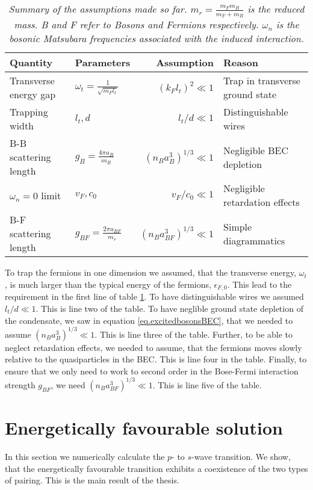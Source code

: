 \begin{table}[htb]
\def\arraystretch{1.3}
\centering
\caption{\textit{Summary of the assumptions made so far. $m_r = \frac{m_Fm_B}{m_F+m_B}$ is the reduced mass. B and F refer to Bosons and Fermions respectively. $\omega_n$ is the bosonic Matsubara frequencies associated with the induced interaction.}}
\begin{tabular}{|l|l|r|l|}
\hline \textbf{Quantity} & \textbf{Parameters} 						& \textbf{Assumption}						& \textbf{Reason}	\\
\hline \hline Transverse energy gap & $\omega_t = \frac{1}{\sqrt{m_Fl_t}}$ & $(k_Fl_t)^2 	 	\ll 1$ 					& Trap in transverse ground state \\
\hline Trapping width 		 & $l_t, d$ 							& $l_t / d 	\ll 1$ 					& Distinguishable wires \\
\hline B-B scattering length & $g_B = \frac{4\pi a_B}{m_B}$			& $(n_Ba_B^3)^{1/3}	\ll 1$					& Negligible BEC depletion  \\
\hline $\omega_n = 0$ limit  & $v_F,c_0$							& $v_F/c_0 \ll 1$ & Negligible retardation effects  \\
\hline B-F scattering length & $g_{BF} = \frac{2\pi a_{BF}}{m_r}$ 	& $(n_Ba_{BF}^3)^{1/3}	\ll 1$				& Simple diagrammatics\\
\hline 
\end{tabular}
\label{tab.assumptions}
\end{table} 

To trap the fermions in one dimension we assumed, that the transverse energy, $\omega_t$, is much larger than the typical energy of the fermions, $\epsilon_{F,0}$. This lead to the requirement in the first line of table \ref{tab.assumptions}. To have distinguishable wires we assumed $l_t / d \ll 1$. This is line two of the table. To have neglible ground state depletion of the condensate, we saw in equation \eqref{eq.excitedbosonsBEC}, that we needed to assume $(n_Ba_B^3)^{1/3}\ll 1$. This is line three of the table. Further, to be able to neglect retardation effects, we needed to assume, that the fermions moves slowly relative to the quasiparticles in the BEC. This is line four in the table. Finally, to ensure that we only need to work to second order in the Bose-Fermi interaction strength $g_{BF}$, we need $(n_Ba_{BF}^3)^{1/3} \ll 1$. This is line five of the table. 



\section{Energetically favourable solution}
\label{sec.2wiresCrossover_energy}
In this section we numerically calculate the $p$- to $s$-wave transition. We show, that the energetically favourable transition exhibits a coexistence of the two types of pairing. This is the main result of the thesis. 

